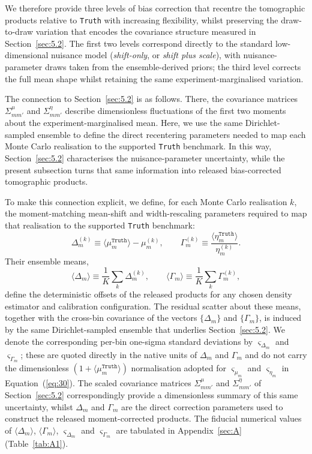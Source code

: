 We therefore provide three levels of bias correction that recentre the tomographic products relative to \texttt{Truth} with increasing flexibility, whilst preserving the draw-to-draw variation that encodes the covariance structure measured in Section~\ref{sec:5.2}. The first two levels correspond directly to the standard low-dimensional nuisance model (\textit{shift-only}, or \textit{shift plus scale}), with nuisance-parameter draws taken from the ensemble-derived priors; the third level corrects the full mean shape whilst retaining the same experiment-marginalised variation.

The connection to Section~\ref{sec:5.2} is as follows. There, the covariance matrices \(\Sigma^\mu_{m m'}\) and \(\Sigma^\eta_{m m'}\) describe dimensionless fluctuations of the first two moments about the experiment-marginalised mean. Here, we use the same Dirichlet-sampled ensemble to define the direct recentering parameters needed to map each Monte Carlo realisation to the supported \texttt{Truth} benchmark. In this way, Section~\ref{sec:5.2} characterises the nuisance-parameter uncertainty, while the present subsection turns that same information into released bias-corrected tomographic products.

To make this connection explicit, we define, for each Monte Carlo realisation \(k\), the moment-matching mean-shift and width-rescaling parameters required to map that realisation to the supported \texttt{Truth} benchmark:
\begin{equation} \label{eq:34}
    \Delta_m^{(k)} \equiv \langle \mu_m^{\texttt{Truth}} \rangle - \mu_m^{(k)}, \qquad \Gamma_m^{(k)} \equiv \frac{\langle \eta_m^{\texttt{Truth}} \rangle}{\eta_m^{(k)}}.
\end{equation}
Their ensemble means,
\begin{equation} \label{eq:35}
    \langle \Delta_m \rangle \equiv \frac{1}{K}\sum_{k}\Delta_m^{(k)}, \qquad \langle \Gamma_m \rangle \equiv \frac{1}{K}\sum_{k}\Gamma_m^{(k)},
\end{equation}
define the deterministic offsets of the released products for any chosen density estimator and calibration configuration. The residual scatter about these means, together with the cross-bin covariance of the vectors \(\{\Delta_m\}\) and \(\{\Gamma_m\}\), is induced by the same Dirichlet-sampled ensemble that underlies Section~\ref{sec:5.2}. We denote the corresponding per-bin one-sigma standard deviations by \(\varsigma_{\Delta_m}\) and \(\varsigma_{\Gamma_m}\); these are quoted directly in the native units of \(\Delta_m\) and \(\Gamma_m\) and do not carry the dimensionless \((1+\langle\mu_m^{\texttt{Truth}}\rangle)\) normalisation adopted for \(\varsigma_{\mu_m}\) and \(\varsigma_{\eta_m}\) in Equation~(\ref{eq:30}). The scaled covariance matrices \(\Sigma^\mu_{m m'}\) and \(\Sigma^\eta_{m m'}\) of Section~\ref{sec:5.2} correspondingly provide a dimensionless summary of this same uncertainty, whilst \(\Delta_m\) and \(\Gamma_m\) are the direct correction parameters used to construct the released moment-corrected products. The fiducial numerical values of \(\langle\Delta_m\rangle\), \(\langle\Gamma_m\rangle\), \(\varsigma_{\Delta_m}\) and \(\varsigma_{\Gamma_m}\) are tabulated in Appendix~\ref{sec:A} (Table~\ref{tab:A1}).


